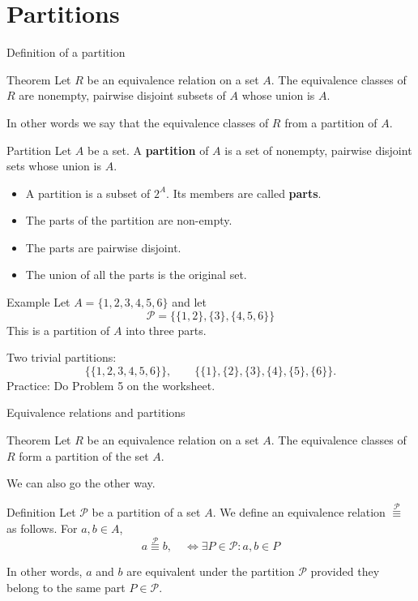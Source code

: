 \documentclass{beamer}
\def\bl[#1]#2{\begin{block}{#1}#2\end{block}}
\def\itemb{\begin{itemize}}
\def\iteme{\end{itemize}}
\begin{document}
\section{Partitions}


\begin{frame}{Definition of a partition}
\bl[Theorem]{
Let $R$ be an equivalence relation on a set $A$. The equivalence classes of $R$ are nonempty, pairwise disjoint subsets of $A$ whose union is $A$.}
In other words we say that the equivalence classes of $R$ from a partition of $A$.

\bl[Partition]{
Let $A$ be a set. A \textbf{partition} of $A$ is a set of nonempty, pairwise disjoint sets whose union is $A$.
}
\itemb
\item A partition is a subset of $2^A$. Its members are called \textbf{parts}.
\item The parts of the partition are non-empty. 
\item The parts are pairwise disjoint.
\item The union of all the parts is the original set.
\iteme
\end{frame}

\begin{frame}{Example}
Let $A=\{1,2,3,4,5,6\}$ and let
\[
\mathcal{P}=\{\{1,2\},\{3\},\{4,5,6\}\}
\]
This is a partition of $A$ into three parts.

\vspace{0.5cm}
Two trivial partitions:
\[
\{\{1,2,3,4,5,6\}\},\qquad \{\{1\},\{2\},\{3\},\{4\},\{5\},\{6\}\}.
\]
Practice: Do Problem 5 on the worksheet.
\end{frame}

\begin{frame}{Equivalence relations and partitions}
\bl[Theorem]{
Let $R$ be an equivalence relation on a set $A$. The equivalence classes of $R$ form a partition of the set $A$.}

We can also go the other way.

\bl[Definition]{
Let $\mathcal{P}$ be a partition of a set $A$. We define an equivalence relation $\stackrel{\mathcal{P}}{\equiv}$ as follows. For $a,b\in A$,
\[
a\stackrel{\mathcal{P}}{\equiv} b,\quad\Leftrightarrow \exists P\in\mathcal{P}: a,b\in P
\]
}
In other words, $a$ and $b$ are equivalent under the partition $\mathcal{P}$ provided they belong to the same part $P\in\mathcal{P}$.
\end{frame}
\end{document}
